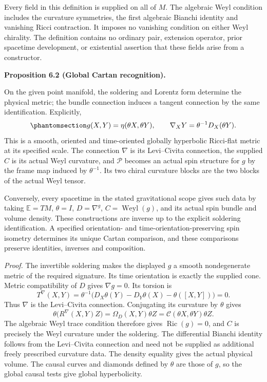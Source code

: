 \documentclass[
  english,
  11pt,
  reqno]{amsart}
\makeatletter
\newcommand{\pandocstatementheading}[1]{%
  \par\addpenalty{\@beginparpenalty}%
  \addvspace{.5\baselineskip plus .2\baselineskip minus .2\baselineskip}%
  {\normalfont\bfseries #1\par}%
  \nobreak\@afterindenttrue\@afterheading
}
\makeatother
\begin{document}
Every field in this definition is supplied on all of \(M\). The
algebraic Weyl condition includes the curvature symmetries, the first
algebraic Bianchi identity and vanishing Ricci contraction. It imposes
no vanishing condition on either Weyl chirality. The definition contains
no ordinary pair, extension operator, prior spacetime development, or
existential assertion that these fields arise from a constructor.

\pandocstatementheading{\protect{}\label{prop:global-cartan-recognition}Proposition 6.2 (Global Cartan recognition).}

On the given point manifold, the soldering and Lorentz form determine
the physical metric; the bundle connection induces a tangent connection
by the same identification. Explicitly,
\begin{equation}\protect\phantomsection\label{eq:global-cartan-readout}{
g(X,Y)=\eta(\theta X,\theta Y),
\qquad
\nabla_XY=\theta^{-1}D_X(\theta Y).
}\end{equation} This is a smooth, oriented and time-oriented globally
hyperbolic Ricci-flat metric at its specified scale. The connection
\(\nabla\) is its Levi--Civita connection, the supplied \(C\) is its
actual Weyl curvature, and \(\mathcal P\) becomes an actual spin
structure for \(g\) by the frame map induced by \(\theta^{-1}\). Its two
chiral curvature blocks are the two blocks of the actual Weyl tensor.

Conversely, every spacetime in the stated gravitational scope gives such
data by taking \(\mathbb E=TM\), \(\theta=I\), \(D=\nabla^g\),
\(C=\operatorname{Weyl}(g)\), and its actual spin bundle and volume
density. These constructions are inverse up to the explicit soldering
identification. A specified orientation- and time-orientation-preserving
spin isometry determines its unique Cartan comparison, and these
comparisons preserve identities, inverses and composition.

\emph{Proof.} The invertible soldering makes the displayed \(g\) a
smooth nondegenerate metric of the required signature. Its time
orientation is exactly the supplied cone. Metric compatibility of \(D\)
gives \(\nabla g=0\). Its torsion is \[
T^\nabla(X,Y)
=\theta^{-1}\bigl(D_X\theta(Y)-D_Y\theta(X)-\theta([X,Y])\bigr)=0.
\] Thus \(\nabla\) is the Levi--Civita connection. Conjugating its
curvature by \(\theta\) gives \[
\theta\bigl(R^\nabla(X,Y)Z\bigr)
=\Omega_D(X,Y)\theta Z
=\mathcal C(\theta X,\theta Y)\theta Z.
\] The algebraic Weyl trace condition therefore gives
\(\operatorname{Ric}(g)=0\), and \(C\) is precisely the Weyl curvature
under the soldering. The differential Bianchi identity follows from the
Levi--Civita connection and need not be supplied as additional freely
prescribed curvature data. The density equality gives the actual
physical volume. The causal curves and diamonds defined by \(\theta\)
are those of \(g\), so the global causal tests give global
hyperbolicity.
\end{document}
